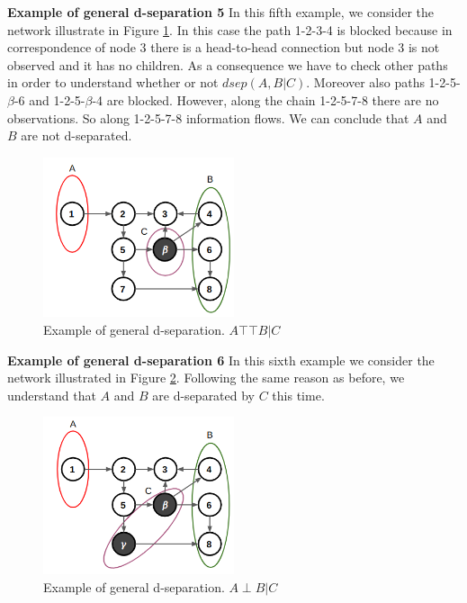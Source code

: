 \textbf{Example of general d-separation 5} \newline
In this fifth example, we consider the network illustrate in Figure \ref{fig:exampleDSeparation5}. In this case the path 1-2-3-4 is blocked because in correspondence of node 3 there is a head-to-head connection but node 3 is not observed and it has no children. As a consequence we have to check other paths in order to understand whether or not $\mathit{dsep}(A,B|C)$. Moreover also paths 1-2-5-$\beta$-6 and 1-2-5-$\beta$-4 are blocked. However, along the chain 1-2-5-7-8 there are no observations. So along 1-2-5-7-8 information flows. We can conclude that $A$ and $B$ are not d-separated. \newline

\begin{figure}
    \centering
    \includegraphics[width=0.5\textwidth]{images/exampleGeneralDSeparation4.png}
    \caption{Example of general d-separation. $A \top\!\!\!\!\top B | C$ }
    \label{fig:exampleDSeparation5}
\end{figure}

\textbf{Example of general d-separation 6} \newline
In this sixth example we consider the network illustrated in Figure \ref{fig:exampleDSeparation6}. Following the same reason as before, we understand that $A$ and $B$ are d-separated by $C$ this time.

\begin{figure}
    \centering
    \includegraphics[width=0.5\textwidth]{images/exampleGeneralDSeparation5.png}
    \caption{Example of general d-separation. $A \perp B | C$ }
    \label{fig:exampleDSeparation6}
\end{figure}

